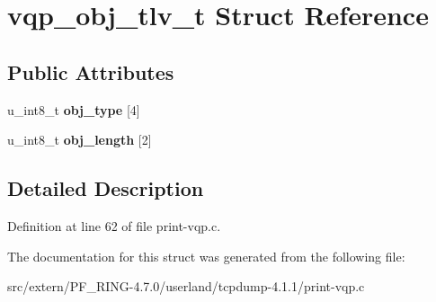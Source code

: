 \hypertarget{structvqp__obj__tlv__t}{
\section{vqp\_\-obj\_\-tlv\_\-t Struct Reference}
\label{structvqp__obj__tlv__t}
}
\subsection*{Public Attributes}
\begin{DoxyCompactItemize}
\item 
\hypertarget{structvqp__obj__tlv__t_a923f7edae2e0c84e9083a8b7164def34}{
u\_\-int8\_\-t {\bfseries obj\_\-type} \mbox{[}4\mbox{]}}
\label{structvqp__obj__tlv__t_a923f7edae2e0c84e9083a8b7164def34}

\item 
\hypertarget{structvqp__obj__tlv__t_adacf6d3aae7b210dd752e49b71de870b}{
u\_\-int8\_\-t {\bfseries obj\_\-length} \mbox{[}2\mbox{]}}
\label{structvqp__obj__tlv__t_adacf6d3aae7b210dd752e49b71de870b}

\end{DoxyCompactItemize}


\subsection{Detailed Description}


Definition at line 62 of file print-\/vqp.c.



The documentation for this struct was generated from the following file:\begin{DoxyCompactItemize}
\item 
src/extern/PF\_\-RING-\/4.7.0/userland/tcpdump-\/4.1.1/print-\/vqp.c\end{DoxyCompactItemize}
